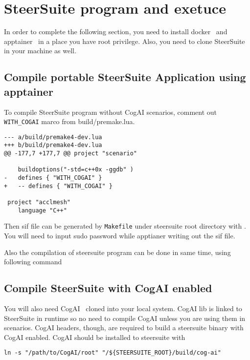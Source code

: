\chapter{SteerSuite program and exetuce}

In order to complete the following section, you need to install docker~\cite{docker} and apptainer~\cite{apptainer} in a 
place you have root privilege. Also, you need to clone SteerSuite~\cite{kdresearch-steersuite} in your machine as well.

\section{Compile portable SteerSuite Application using apptainer}

\label{sec:steersuite-compile}
To compile SteerSuite program without CogAI scenarios, comment out \verb"WITH_COGAI" marco from build/premake.lua.

\begin{verbatim}
--- a/build/premake4-dev.lua
+++ b/build/premake4-dev.lua
@@ -177,7 +177,7 @@ project "scenario"
    
    buildoptions("-std=c++0x -ggdb" )   
-   defines { "WITH_COGAI" }
+   -- defines { "WITH_COGAI" }
 
 project "acclmesh"
    language "C++"
\end{verbatim}

Then sif file can be generated by \texttt{Makefile} under steersuite root directory with
.
You will need to input sudo password while apptianer writing out the sif file.

Also the compilation of steersuite program can be done in same time, using following command

\section{Compile SteerSuite with CogAI enabled}

You will also need CogAI~\cite{kdresearch-cogai} cloned into your local system. CogAI lib is linked to SteerSuite in 
runtime so no need to compile CogAI unless you are using them in scenarios. CogAI headers, though, are required to build 
a steersuite binary with CogAI enabled. CogAI should be installed to steersuite with

\begin{verbatim}
ln -s "/path/to/CogAI/root" "/${STEERSUITE_ROOT}/build/cog-ai" 
\end{verbatim}

